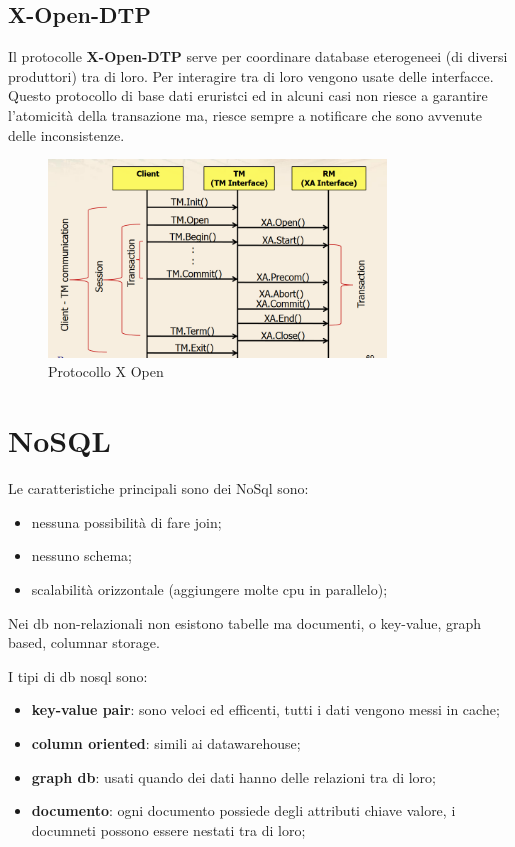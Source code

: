 \documentclass[12pt]{article}
\begin{document}
\subsection{X-Open-DTP}
Il protocolle \textbf{X-Open-DTP}  serve per coordinare database eterogeneei (di diversi produttori) tra di loro. Per interagire tra di loro vengono usate delle interfacce. Questo protocollo di base dati eruristci ed in alcuni casi non riesce a garantire l'atomicit\`a della transazione ma, riesce sempre a notificare che sono avvenute delle inconsistenze.
\begin{figure}[H]
    \centering
    \includegraphics[width=0.8\textwidth]{protocollo-x-open.png}
    \caption{Protocollo X Open}
    \label{fig:protocollo-x-open}
\end{figure}



\newpage
\section{NoSQL}
Le caratteristiche principali sono dei NoSql sono:
\begin{itemize}
    \item nessuna possibilit\`a di fare join;
    \item nessuno schema;
    \item scalabilit\`a orizzontale (aggiungere molte cpu in parallelo);
\end{itemize}
Nei db non-relazionali non esistono tabelle ma documenti, o key-value, graph based, columnar storage.

I tipi di db nosql sono:
\begin{itemize}
    \item \textbf{key-value pair}: sono veloci ed efficenti, tutti i dati vengono messi in cache;
    \item \textbf{column oriented}: simili ai datawarehouse;
    \item \textbf{graph db}: usati quando dei dati hanno delle relazioni tra di loro;
    \item \textbf{documento}: ogni documento possiede degli attributi chiave valore, i documneti possono essere nestati tra di loro;
\end{itemize}
\end{document}
